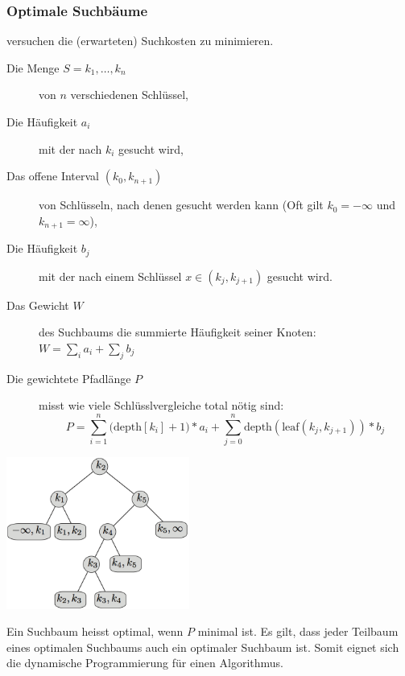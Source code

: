 \documentclass[a4paper, 9pt, DIV=20]{scrartcl}
\begin{document}
\subsubsection{Optimale Suchbäume} versuchen die (erwarteten) Suchkosten zu minimieren.
\begin{description}
\item[Die Menge $S=k_{1}, \dots, k_{n}$] von $n$ verschiedenen Schlüssel,
\item[Die Häufigkeit $a_{i}$] mit der nach $k_{i}$ gesucht wird,
\item[Das offene Interval $(k_{0}, k_{n+1})$] von Schlüsseln, nach denen gesucht werden kann (Oft gilt $k_{0}=-\infty$ und $k_{n+1}=\infty$),
\item[Die Häufigkeit $b_{j}$] mit der nach einem Schlüssel $x\in (k_{j}, k_{j+1})$ gesucht wird.
\item[Das Gewicht $W$] des Suchbaums die summierte Häufigkeit seiner Knoten: $W=\sum_{i}{a_{i}}+\sum_{j}{b_j}$
\item[Die gewichtete Pfadlänge $P$] misst wie viele Schlüsslvergleiche total nötig sind: \[P= \sum^{n}_{i=1}{(\text{depth}[k_{i}]+1})*a_{i}+\sum^{n}_{j=0}{\text{depth}(\text{leaf}(k_{j}, k_{j+1}))*b_{j}}\]
\end{description} 
\begin{center}
\includegraphics[width=6cm]{OptimalerSuchbaum}
\end{center}

Ein Suchbaum heisst optimal, wenn $P$ minimal ist. Es gilt, dass jeder Teilbaum eines optimalen Suchbaums auch ein optimaler Suchbaum ist. Somit eignet sich die dynamische Programmierung für einen Algorithmus.
\end{document}

